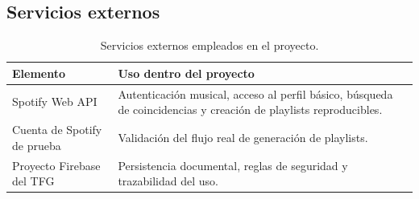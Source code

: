 \subsection*{Servicios externos}

\begin{table}[H]
\centering
\small
\renewcommand{\arraystretch}{1.1}
\begin{tabularx}{\textwidth}{|P{3.2cm}|Y|}
\hline
\textbf{Elemento} & \textbf{Uso dentro del proyecto} \\
\hline
Spotify Web API & Autenticación musical, acceso al perfil básico, búsqueda de coincidencias y creación de playlists reproducibles. \\
\hline
Cuenta de Spotify de prueba & Validación del flujo real de generación de playlists. \\
\hline
Proyecto Firebase del TFG & Persistencia documental, reglas de seguridad y trazabilidad del uso. \\
\hline
\end{tabularx}
\caption{Servicios externos empleados en el proyecto.}
\label{tab:recursos_servicios}
\end{table}
